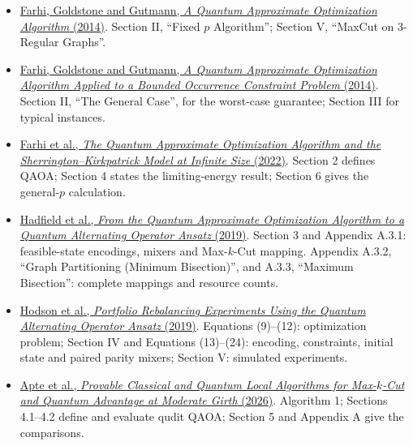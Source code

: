 \documentclass[11pt,a4paper]{article}
\theoremstyle{problemstyle}
\newenvironment{algorithmindex}[1]{%
  \begin{itemize}[label=\textbullet,leftmargin=1.3em,labelsep=0.6em,itemsep=4pt,topsep=3pt,parsep=0pt]
  \small
}{\end{itemize}}
\begin{document}
\begin{algorithmindex}{qaoa}

\item \href{https://arxiv.org/pdf/1411.4028}{Farhi, Goldstone and Gutmann, \emph{A Quantum Approximate Optimization Algorithm} (2014)}. Section II, ``Fixed $p$ Algorithm''; Section V, ``MaxCut on 3-Regular Graphs''.

\item \href{https://arxiv.org/pdf/1412.6062}{Farhi, Goldstone and Gutmann, \emph{A Quantum Approximate Optimization Algorithm Applied to a Bounded Occurrence Constraint Problem} (2014)}. Section II, ``The General Case'', for the worst-case guarantee; Section III for typical instances.

\item \href{https://arxiv.org/pdf/1910.08187}{Farhi et al., \emph{The Quantum Approximate Optimization Algorithm and the Sherrington--Kirkpatrick Model at Infinite Size} (2022)}. Section 2 defines QAOA; Section 4 states the limiting-energy result; Section 6 gives the general-$p$ calculation.

\item \href{https://arxiv.org/abs/1709.03489}{Hadfield et al., \emph{From the Quantum Approximate Optimization Algorithm to a Quantum Alternating Operator Ansatz} (2019)}. Section 3 and Appendix A.3.1: feasible-state encodings, mixers and Max-$k$-Cut mapping. Appendix A.3.2, ``Graph Partitioning (Minimum Bisection)'', and A.3.3, ``Maximum Bisection'': complete mappings and resource counts.

\item \href{https://arxiv.org/abs/1911.05296}{Hodson et al., \emph{Portfolio Rebalancing Experiments Using the Quantum Alternating Operator Ansatz} (2019)}. Equations (9)--(12): optimization problem; Section IV and Equations (13)--(24): encoding, constraints, initial state and paired parity mixers; Section V: simulated experiments.

\item \href{https://arxiv.org/abs/2609.39042}{Apte et al., \emph{Provable Classical and Quantum Local Algorithms for Max-$k$-Cut and Quantum Advantage at Moderate Girth} (2026)}. Algorithm 1; Sections 4.1--4.2 define and evaluate qudit QAOA; Section 5 and Appendix A give the comparisons.

\end{algorithmindex}
\end{document}
